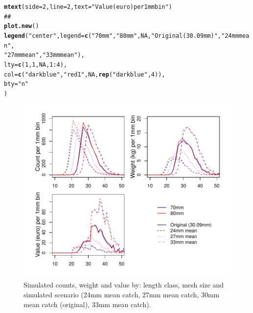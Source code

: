 \documentclass[12pt]{article}\usepackage[]{graphicx}\usepackage[]{color}
\makeatletter
\def\maxwidth{ %
  \ifdim\Gin@nat@width>\linewidth
    \linewidth
  \else
    \Gin@nat@width
  \fi
}
\newcommand{\hlnum}[1]{\textcolor[rgb]{0.686,0.059,0.569}{#1}}%
\newcommand{\hlstr}[1]{\textcolor[rgb]{0.192,0.494,0.8}{#1}}%
\newcommand{\hlcom}[1]{\textcolor[rgb]{0.678,0.584,0.686}{\textit{#1}}}%
\newcommand{\hlopt}[1]{\textcolor[rgb]{0,0,0}{#1}}%
\newcommand{\hlstd}[1]{\textcolor[rgb]{0.345,0.345,0.345}{#1}}%
\newcommand{\hlkwc}[1]{\textcolor[rgb]{0.333,0.667,0.333}{#1}}%
\newcommand{\hlkwd}[1]{\textcolor[rgb]{0.737,0.353,0.396}{\textbf{#1}}}%
\newenvironment{kframe}{%
 \def\at@end@of@kframe{}%
 \ifinner\ifhmode%
  \def\at@end@of@kframe{\end{minipage}}%
  \begin{minipage}{\columnwidth}%
 \fi\fi%
 \def\FrameCommand##1{\hskip\@totalleftmargin \hskip-\fboxsep
 \colorbox{shadecolor}{##1}\hskip-\fboxsep
     \hskip-\linewidth \hskip-\@totalleftmargin \hskip\columnwidth}%
 \MakeFramed {\advance\hsize-\width
   \@totalleftmargin\z@ \linewidth\hsize
   \@setminipage}}%
 {\par\unskip\endMakeFramed%
 \at@end@of@kframe}
\newenvironment{knitrout}{}{} %
\makeatother
\begin{document}
\begin{knitrout}
\begin{kframe}
\begin{alltt}
\hlkwd{mtext}\hlstd{(}\hlkwc{side} \hlstd{=} \hlnum{2}\hlstd{,} \hlkwc{line} \hlstd{=} \hlnum{2}\hlstd{,} \hlkwc{text} \hlstd{=} \hlstr{"Value (euro) per 1mm bin"}\hlstd{)}
\hlcom{##}
\hlkwd{plot.new}\hlstd{()}
\hlkwd{legend}\hlstd{(}\hlstr{"center"}\hlstd{,} \hlkwc{legend} \hlstd{=} \hlkwd{c}\hlstd{(}\hlstr{"70mm"}\hlstd{,} \hlstr{"80mm"}\hlstd{,} \hlnum{NA}\hlstd{,} \hlstr{"Original (30.09mm)"}\hlstd{,} \hlstr{"24mm mean"}\hlstd{,}
                   \hlstr{"27mm mean"}\hlstd{,} \hlstr{"33mm mean"}\hlstd{),}
       \hlkwc{lty} \hlstd{=} \hlkwd{c}\hlstd{(}\hlnum{1}\hlstd{,}\hlnum{1}\hlstd{,}\hlnum{NA}\hlstd{,} \hlnum{1}\hlopt{:}\hlnum{4}\hlstd{),}
       \hlkwc{col} \hlstd{=} \hlkwd{c}\hlstd{(}\hlstr{"darkblue"}\hlstd{,} \hlstr{"red1"}\hlstd{,} \hlnum{NA}\hlstd{,} \hlkwd{rep}\hlstd{(}\hlstr{"darkblue"}\hlstd{,} \hlnum{4}\hlstd{)),}
       \hlkwc{bty} \hlstd{=} \hlstr{"n"}
       \hlstd{)}
\end{alltt}
\end{kframe}\begin{figure}
\includegraphics[width=\maxwidth]{figure/split_plots-1} \caption[Simulated counts, weight and value by]{Simulated counts, weight and value by: length class, mesh size and  simulated scenario (24mm mean catch, 27mm mean catch, 30mm mean catch (original), 33mm mean catch).}\label{fig:split_plots}
\end{figure}


\end{knitrout}
\end{document}
